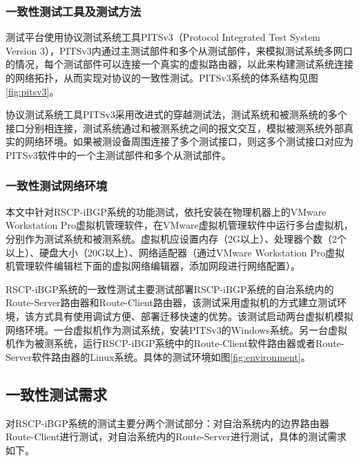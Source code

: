 \subsubsection{一致性测试工具及测试方法}
测试平台使用协议测试系统工具PITSv3\cite{journals_chinaf_YinWJS08}（Protocol Integrated Test System Version 3），PITSv3内通过主测试部件和多个从测试部件，来模拟测试系统多网口的情况，每个测试部件可以连接一个真实的虚拟路由器，以此来构建测试系统连接的网络拓扑，从而实现对协议的一致性测试。PITSv3系统的体系结构见图\ref{fig:pitsv3}。


协议测试系统工具PITSv3采用改进式的穿越测试法，测试系统和被测系统的多个接口分别相连接，测试系统通过和被测系统之间的报文交互，模拟被测系统外部真实的网络环境。如果被测设备周围连接了多个测试接口，则这多个测试接口对应为PITSv3软件中的一个主测试部件和多个从测试部件。


\subsubsection{一致性测试网络环境}
本文中针对RSCP-iBGP系统的功能测试，依托安装在物理机器上的VMware Workstation Pro虚拟机管理软件，在VMware虚拟机管理软件中运行多台虚拟机，分别作为测试系统和被测系统。虚拟机应设置内存（2G以上）、处理器个数（2个以上）、硬盘大小（20G以上）、网络适配器（通过VMware Workstation Pro虚拟机管理软件编辑栏下面的虚拟网络编辑器，添加网段进行网络配置）。

RSCP-iBGP系统的一致性测试主要测试部署RSCP-iBGP系统的自治系统内的Route-Server路由器和Route-Client路由器，该测试采用虚拟机的方式建立测试环境，该方式具有使用调试方便、部署迁移快速的优势。该测试启动两台虚拟机模拟网络环境。一台虚拟机作为测试系统，安装PITSv3的Windows系统。另一台虚拟机作为被测系统，运行RSCP-iBGP系统中的Route-Client软件路由器或者Route-Server软件路由器的Linux系统。具体的测试环境如图\ref{fig:environment}。

\subsection{一致性测试需求}

对RSCP-iBGP系统的测试主要分两个测试部分：对自治系统内的边界路由器Route-Client进行测试，对自治系统内的Route-Server进行测试，具体的测试需求如下。



